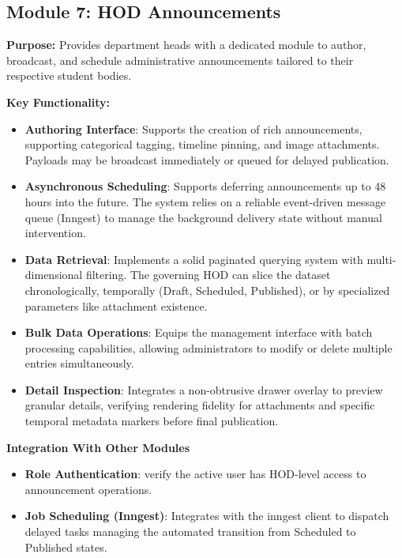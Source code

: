 \subsection{Module 7: HOD Announcements}

\textbf{Purpose:}
Provides department heads with a dedicated module to author, broadcast, and schedule administrative announcements tailored to their respective student bodies.

\textbf{Key Functionality:}
\begin{itemize}
    \item \textbf{Authoring Interface}: Supports the creation of rich announcements, supporting categorical tagging, timeline pinning, and image attachments. Payloads may be broadcast immediately or queued for delayed publication.
    \item \textbf{Asynchronous Scheduling}: Supports deferring announcements up to 48 hours into the future. The system relies on a reliable event-driven message queue (Inngest) to manage the background delivery state without manual intervention.
    \item \textbf{Data Retrieval}: Implements a solid paginated querying system with multi-dimensional filtering. The governing HOD can slice the dataset chronologically, temporally (Draft, Scheduled, Published), or by specialized parameters like attachment existence.
    \item \textbf{Bulk Data Operations}: Equips the management interface with batch processing capabilities, allowing administrators to modify or delete multiple entries simultaneously.
    \item \textbf{Detail Inspection}: Integrates a non-obtrusive drawer overlay to preview granular details, verifying rendering fidelity for attachments and specific temporal metadata markers before final publication.
\end{itemize}

\textbf{Integration With Other Modules}
\begin{itemize}
    \item \textbf{Role Authentication}: verify the active user has HOD-level access to announcement operations.
    \item \textbf{Job Scheduling (Inngest)}: Integrates with the inngest client to dispatch delayed tasks managing the automated transition from Scheduled to Published states.
\end{itemize}



